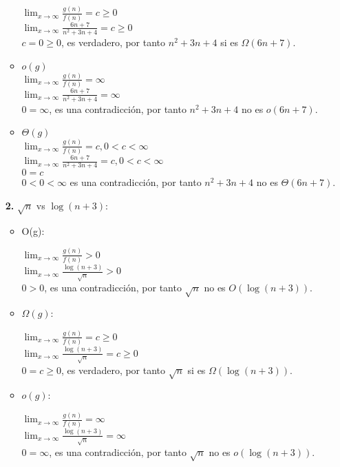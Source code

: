 \documentclass{article}
\begin{document}
\begin{enumerate}[label=\textbf{\alph*.}]
\begin{itemize}
      $\lim_{x\to\infty} \frac{g(n)}{f(n)}=c \geq 0$\\
      $\lim_{x\to\infty} \frac{6n+7}{n^2 +3n+4}=c \geq 0$\\
      $c=0 \geq 0$, es verdadero, por tanto $n^2 +3n+4$ si es $\Omega(6n+7)$.
    
      \item $o(g)$\\
      $\lim_{x\to\infty} \frac{g(n)}{f(n)}=\infty$\\
      $\lim_{x\to\infty} \frac{6n+7}{n^2 +3n+4}=\infty$\\
      $0=\infty$, es una contradicción, por tanto $n^2 +3n+4$ no es $o(6n+7)$.
    
      \item $\Theta(g)$\\
      $\lim_{x\to\infty} \frac{g(n)}{f(n)}=c,0<c<\infty$\\
      $\lim_{x\to\infty} \frac{6n+7}{n^2 +3n+4}=c,0<c<\infty$\\
      $0=c$\\
	  $0<0<\infty$ es una contradicción, por tanto $n^2 +3n+4$ no es $\Theta(6n+7)$.\\
    
  \end{itemize}
  
  \textbf{2.} $\sqrt{n}$ vs $\log(n+3)$:
\begin{itemize}
      \item O(g):
      
      $\lim_{x\to\infty} \frac{g(n)}{f(n)}>0$\\
      $\lim_{x\to\infty} \frac{\log(n+3)}{\sqrt{n}}>0$\\
      $0>0$, es una contradicción, por tanto $\sqrt{n}$ no es $O(\log(n+3))$.
    
      \item $\Omega(g)$:
      
      $\lim_{x\to\infty} \frac{g(n)}{f(n)}=c \geq 0$\\
      $\lim_{x\to\infty} \frac{\log(n+3)}{\sqrt{n}}=c \geq 0$\\
      $0=c \geq 0$, es verdadero, por tanto $\sqrt{n}$ si es $\Omega(\log(n+3))$.
    
      \item $o(g)$:
      
      $\lim_{x\to\infty} \frac{g(n)}{f(n)}=\infty$\\
      $\lim_{x\to\infty} \frac{\log(n+3)}{\sqrt{n}}=\infty$\\
      $0=\infty$, es una contradicción, por tanto $\sqrt{n}$ no es $o(\log(n+3))$.
    

\end{itemize}
\end{enumerate}
\end{document}

